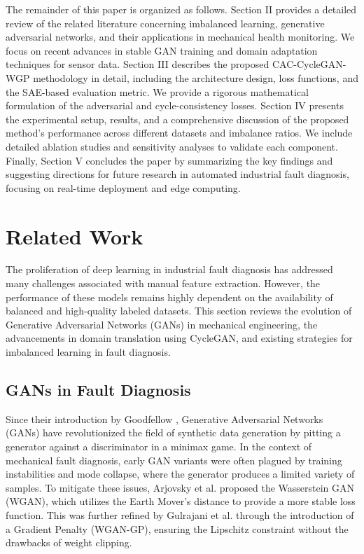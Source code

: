 \documentclass[twocolumn]{IEEEtran}
\begin{document}
The remainder of this paper is organized as follows. Section II provides a detailed review of the related literature concerning imbalanced learning, generative adversarial networks, and their applications in mechanical health monitoring. We focus on recent advances in stable GAN training and domain adaptation techniques for sensor data. Section III describes the proposed CAC-CycleGAN-WGP methodology in detail, including the architecture design, loss functions, and the SAE-based evaluation metric. We provide a rigorous mathematical formulation of the adversarial and cycle-consistency losses. Section IV presents the experimental setup, results, and a comprehensive discussion of the proposed method's performance across different datasets and imbalance ratios. We include detailed ablation studies and sensitivity analyses to validate each component. Finally, Section V concludes the paper by summarizing the key findings and suggesting directions for future research in automated industrial fault diagnosis, focusing on real-time deployment and edge computing.


\section{Related Work}
\label{sec:related_work}
The proliferation of deep learning in industrial fault diagnosis has addressed many challenges associated with manual feature extraction. However, the performance of these models remains highly dependent on the availability of balanced and high-quality labeled datasets. This section reviews the evolution of Generative Adversarial Networks (GANs) in mechanical engineering, the advancements in domain translation using CycleGAN, and existing strategies for imbalanced learning in fault diagnosis.

\subsection{GANs in Fault Diagnosis}
Since their introduction by Goodfellow \cite{1}, Generative Adversarial Networks (GANs) have revolutionized the field of synthetic data generation by pitting a generator against a discriminator in a minimax game. In the context of mechanical fault diagnosis, early GAN variants were often plagued by training instabilities and mode collapse, where the generator produces a limited variety of samples. To mitigate these issues, Arjovsky et al. \cite{2} proposed the Wasserstein GAN (WGAN), which utilizes the Earth Mover's distance to provide a more stable loss function. This was further refined by Gulrajani et al. \cite{3} through the introduction of a Gradient Penalty (WGAN-GP), ensuring the Lipschitz constraint without the drawbacks of weight clipping.
\end{document}
